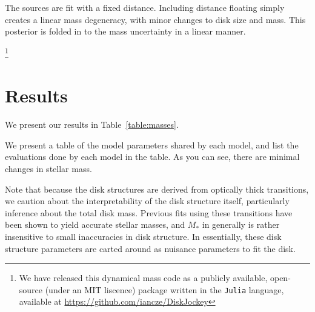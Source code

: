 \documentclass{aastex6}
\begin{document}
The sources are fit with a fixed distance. Including distance floating \citep[e.g.,][]{czekala15a,czekala16} simply creates a linear mass degeneracy, with minor changes to disk size and mass. This posterior is folded in to the mass uncertainty in a linear manner.

\footnote{We have released this dynamical mass code as a publicly available, open-source (under an MIT liscence) package written in the \texttt{Julia} language, available at \url{https://github.com/iancze/DiskJockey}}

\section{Results}

We present our results in Table~\ref{table:masses}.

We present a table of the model parameters shared by each model, and list the evaluations done by each model in the table. As you can see, there are minimal changes in stellar mass.

Note that because the disk structures are derived from optically thick transitions, we caution about the interpretability of the disk structure itself, particularly inference about the total disk mass. Previous fits using these transitions have been shown to yield accurate stellar masses, and $M_\ast$ in generally is rather insensitive to small inaccuracies in disk structure. In essentially, these disk structure parameters are carted around as nuisance parameters to fit the disk.



%
\end{document}
